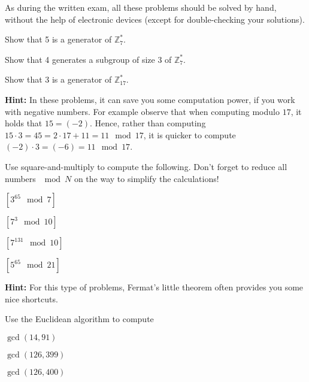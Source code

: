\documentclass[a4paper,10pt,landscape,twocolumn]{scrartcl}
\begin{document}
\practiceproblems

As during the written exam, all these problems should be solved by hand, without the help of electronic devices (except for double-checking your solutions).

\begin{exercise}

\begin{subex}
  Show that 5 is a generator of $\mathbb{Z}_7^*$.
\end{subex}
\begin{subex}
  Show that 4 generates a subgroup of size 3 of $\mathbb{Z}_7^*$.
\end{subex}
\begin{subex}
  Show that 3 is a generator of $\mathbb{Z}_{17}^*$.
\end{subex}

\textbf{Hint: } In these problems, it can save you some computation power, if you work with negative numbers.
 For example observe that when computing modulo $17$, it holds that $15 = (-2)$.
  Hence, rather than computing $15 \cdot 3=45=2 \cdot 17+11=11 \mod 17$, it is quicker to compute $(-2) \cdot 3=(-6)=11 \mod 17$.
\end{exercise}

\begin{exercise}  Use square-and-multiply to compute the following. Don't forget to reduce all numbers $\mod N$ on the way to simplify the calculations!
\begin{subex}
$[3^{65} \mod 7]$
\end{subex}
\begin{subex}
$[7^3 \mod 10]$
\end{subex}
\begin{subex}
$[7^{131} \mod 10]$
\end{subex}
\begin{subex}
$[5^{65} \mod 21]$
\end{subex}
\textbf{Hint: } For this type of problems, Fermat's little theorem often provides you some nice shortcuts.
\end{exercise}

\begin{exercise}  Use the Euclidean algorithm
  to compute
\begin{subex}
  $\gcd(14,91)$
\end{subex}
\begin{subex}
  $\gcd(126, 399)$
\end{subex}
\begin{subex}
  $\gcd(126,400)$
\end{subex}
\end{exercise}
\end{document}

